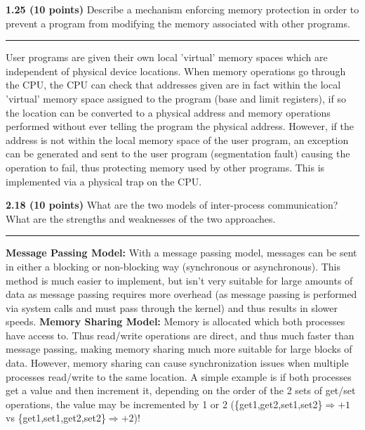 \documentclass[12pt]{jhwhw}
\begin{document}
\bigbreak
\textbf{1.25 (10 points)} Describe a mechanism enforcing memory protection in order to prevent
a program from modifying the memory associated with other programs.
\textcolor[RGB]{240,240,240}{\rule{\textwidth}{0.5pt}}\bigbreak

	\begin{addmargin}[1em]{}
		User programs are given their own local 'virtual' memory spaces which are
		independent of physical device locations.
		When memory operations go through the CPU, the CPU can check
		that addresses given are in fact within the local 'virtual' memory space assigned
		to the program (base and limit registers), 
		if so the location can be converted to a physical address and memory
		operations performed without ever telling the program the physical address. However,
		if the address is not within the local memory space of the user program, an exception
		can be generated and sent to the user program (segmentation fault) causing the
		operation to fail, thus protecting memory used by other programs.
		This is implemented via a physical trap on the CPU.
	\end{addmargin}

\bigbreak
\textbf{2.18 (10 points)} What are the two models of inter-process communication? What
are the strengths and weaknesses of the two approaches.
\textcolor[RGB]{240,240,240}{\rule{\textwidth}{0.5pt}}\bigbreak

	\begin{addmargin}[1em]{}
		\textbf{Message Passing Model:} With a message passing model, messages can be sent
			in either a blocking or non-blocking way (synchronous or asynchronous). This
			method is much easier to implement, but isn't very suitable for large 
			amounts of data as message passing requires more overhead (as message passing
			is performed via system calls and must pass through the kernel) and thus
			results in slower speeds.
		\bigbreak
		\textbf{Memory Sharing Model:} Memory is allocated which both processes have access
			to. Thus read/write operations are direct, and thus much faster than message
			passing, making memory sharing much more suitable for large blocks of data.
			However, memory sharing can cause synchronization issues when multiple processes
			read/write to the same location. A simple example is if both processes get a value
			and then increment it, depending on the order of the 2 sets of get/set operations, the
			value may be incremented by 1 or 2 
			(\{get1,get2,set1,set2\}$\Rightarrow+1$ vs \{get1,set1,get2,set2\}$\Rightarrow+2$)!
	\end{addmargin}
\end{document}
